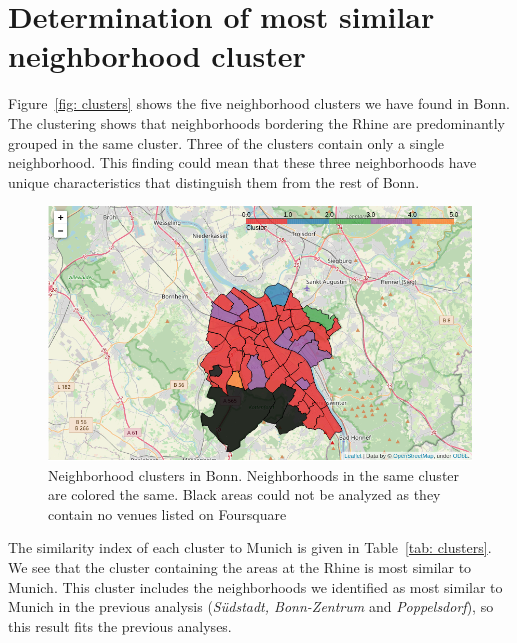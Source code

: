 \documentclass[UKenglish]{scrreprt}
\begin{document}
\section{Determination of most similar neighborhood cluster}

Figure~\ref{fig: clusters} shows the five neighborhood clusters we have found in Bonn. The clustering shows that neighborhoods bordering the Rhine are predominantly grouped in the same cluster. Three of the clusters contain only a single neighborhood. This finding could mean that these three neighborhoods have unique characteristics that distinguish them from the rest of Bonn.

\begin{figure}
	\includegraphics[width=\linewidth]{Figs/Map_clusters}
	\caption{Neighborhood clusters in Bonn. Neighborhoods in the same cluster are colored the same. Black areas could not be analyzed as they contain no venues listed on Foursquare}
	\label{fig:clusters}
\end{figure}

The similarity index of each cluster to Munich is given in Table~\ref{tab: clusters}. We see that the cluster containing the areas at the Rhine is most similar to Munich. This cluster includes the neighborhoods we identified as most similar to Munich in the previous analysis (\emph{Südstadt, Bonn-Zentrum} and \emph{Poppelsdorf}), so this result fits the previous analyses.
\end{document}
